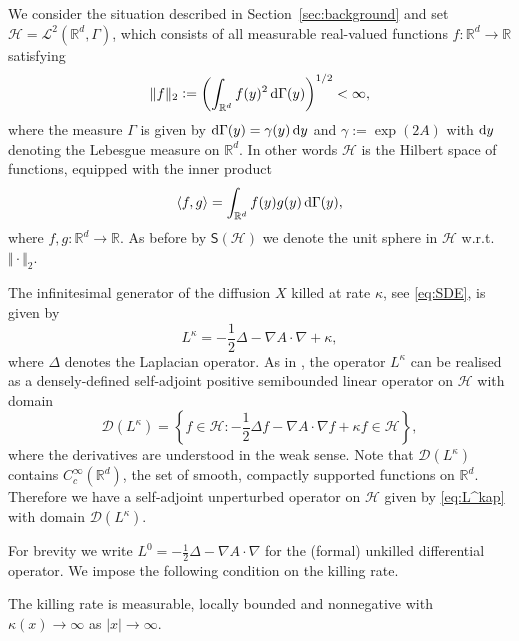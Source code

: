 \documentclass{aptpub}
\newcommand{\R}{\mathbb R}
\newcommand{\Rd}{\mathbb R^d}
\newcommand{\Lk}{L^\kappa}
\newcommand{\Dom}{\mathcal D}
\renewcommand{\H}{\mathcal H}
\begin{document}
We consider the situation described in Section~\ref{sec:background} and set $\H = \mathcal L^2(\Rd, \Gamma)$, which consists of all measurable real-valued functions $f\colon \Rd \to \R $ 
satisfying
\[
    \Vert f \Vert_2:= \left( \int_{\Rd} f(y)^2 \dif\Gamma(y) \right)^{1/2} <\infty,
\]
where the measure $\Gamma$ is given by $\dif \Gamma(y)=\gamma(y)\dif y$ and $\gamma:= \exp(2A)$ with $\dif y$ denoting the Lebesgue measure on $\Rd$. In other words $\H$ is 
the Hilbert space of functions, equipped with the inner product
\begin{equation*}
    \langle f,g\rangle = \int_{\Rd} f(y)g(y) \dif\Gamma(y),
\end{equation*}
where $f,g:\Rd \to \R$. As before by $\mathsf{S}(\H)$ we denote the unit sphere in $\H$ w.r.t. $\Vert\cdot\Vert_2$.


The infinitesimal generator of the diffusion $X$ killed at rate $\kappa$, see \eqref{eq:SDE}, is given by
\begin{equation}
    L^\kappa  =  -\frac{1}{2}\Delta - \nabla A \cdot \nabla + \kappa,
    \label{eq:L^kap}
\end{equation}
where $\Delta$ denotes the Laplacian operator. %
As in \cite[Section 3.3.3]{Wang2020}, the operator $L^\kappa$ can be realised as a densely-defined self-adjoint positive semibounded linear operator on $\H$ with domain
\begin{equation}
    \Dom(L^\kappa) = \left \{f\in \H: -\frac{1}{2}\Delta f - \nabla A \cdot \nabla f + \kappa f \in \H \right\},
    \label{eq:dom_Lkappa}
\end{equation}
where the derivatives are understood in the weak sense. Note that $\Dom(\Lk)$ contains $C_c^\infty(\Rd)$, the set of smooth, compactly supported functions on $\Rd$.
Therefore we have a self-adjoint unperturbed operator on $\H$ given by \eqref{eq:L^kap}
with domain $\Dom(L^\kappa)$. 

For brevity we write $L^0=-\frac{1}{2}\Delta-\nabla A\cdot \nabla$ for the (formal) unkilled differential operator.
We impose the following condition on the killing rate.
\begin{assumption}
    The killing rate is measurable, locally bounded and nonnegative with $\kappa(x)\to \infty$ as $\vert x\vert \to \infty $.
    \label{assm:unbdd_kappa}
\end{assumption}
\end{document}
